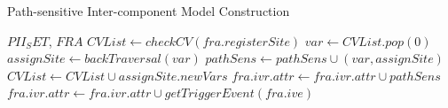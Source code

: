 \begin{algorithm}[!t]
\caption{Path-sensitive Inter-component Model Construction}
\footnotesize
\begin{algorithmic}[1]
 {$PII_SET$, $FRA$}
\State $          CVList \leftarrow checkCV(fra.registerSite ) $
\State $                 var \leftarrow CVList.pop(0)$
\State $                 assignSite \leftarrow backTraversal(var)$
\State $                 pathSens \leftarrow pathSens \cup (var, assignSite )$
\State $                     CVList \leftarrow CVList \cup assignSite.newVars$
\EndIf
\EndWhile    
\State $           fra.ivr.attr \leftarrow fra.ivr.attr \cup pathSens $
\State $           fra.ivr.attr \leftarrow fra.ivr.attr \cup getTriggerEvent(fra.ive)$
\EndFor
\EndProcedure
\end{algorithmic}
\label{fig:alg3}
\end{algorithm}





